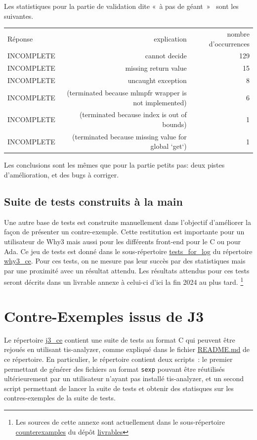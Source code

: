 \documentclass[a4paper,11pt]{article}
\begin{document}
Les statistiques pour la
partie de validation dite «~à pas de géant~»~\cite{becker21rr} sont les suivantes.
\begin{center}
  \begin{tabular}{|l|r|r|}
    \hline
  \rowcolor{gray!50} Réponse
  & \multicolumn{1}{p{0.65\textwidth}|}{explication}
  & \multicolumn{1}{p{0.13\textwidth}|}{nombre d'occurrences}
    \\
INCOMPLETE & cannot decide	& 129 \\
INCOMPLETE & missing return value  &	15 \\
INCOMPLETE & uncaught exception	& 8 \\
INCOMPLETE &  (terminated because mlmpfr wrapper is not implemented) &	6 \\
INCOMPLETE & (terminated because index is out of bounds) &	1 \\
    INCOMPLETE & (terminated because missing value for global `get`) &	1 \\
    \hline
  \end{tabular}
\end{center}
Les conclusions sont les mêmes que pour la partie petits pas: deux
pistes d'amélioration, et des bugs à corriger.


\subsection{Suite de tests construits à la main}

Une autre base de tests est construite manuellement dans l'objectif d'améliorer
la façon de présenter un contre-exemple. Cette restitution est importante pour
un utilisateur de Why3 mais aussi pour les différents front-end pour le C ou
pour Ada. Ce jeu de tests est donné dans le sous-répertoire \url{tests_for_log}
du répertoire \url{why3_ce}. Pour ces tests, on ne mesure pas leur succès par des
statistiques mais par une proximité avec un résultat attendu. Les résultats
attendus pour ces tests seront décrits dans un livrable annexe à celui-ci d'ici
la fin 2024 au plus tard.  \footnote{Les sources de cette annexe sont
  actuellement dans le sous-répertoire \url{counterexamples} du dépôt
  \url{livrables}}

\section{Contre-Exemples issus de J3}

Le répertoire \url{j3_ce} contient une suite de tests au format C qui peuvent
être rejoués en utilisant tis-analyzer, comme expliqué dans le fichier
\url{README.md} de ce répertoire. En particulier, le répertoire contient
deux scripts~: le premier permettant de générer des fichiers au format
\texttt{sexp} pouvant être réutilisés ultérieurement par un utilisateur n'ayant
pas installé tis-analyzer, et un second script permettant de lancer la suite
de tests et obtenir des statisques sur les contres-exemples de la suite de tests.
\end{document}
